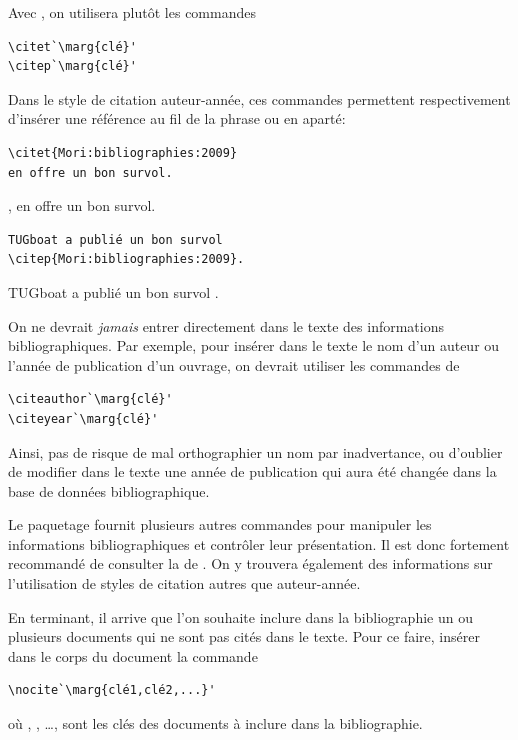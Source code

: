 Avec , on utilisera plutôt les commandes
\begin{lstlisting}
\citet`\marg{clé}'
\citep`\marg{clé}'
\end{lstlisting}
Dans le style de citation auteur-année, ces commandes permettent
respectivement d'insérer une référence au fil de la phrase ou en
aparté:
\begin{demo}
  \begin{texample}[0.55\linewidth]
\begin{lstlisting}
\citet{Mori:bibliographies:2009}
en offre un bon survol.
\end{lstlisting}
    \producing
    \citet{Mori:bibliographies:2009},
    en offre un bon survol.
  \end{texample}
  \begin{texample}[0.55\linewidth]
\begin{lstlisting}
TUGboat a publié un bon survol
\citep{Mori:bibliographies:2009}.
\end{lstlisting}
    \producing
    TUGboat a publié un bon survol
    \citep{Mori:bibliographies:2009}.
  \end{texample}
\end{demo}

On ne devrait \emph{jamais} entrer directement dans le texte des
informations bibliographiques. Par exemple, pour insérer dans le texte
le nom d'un auteur ou l'année de publication d'un ouvrage, on devrait
utiliser les commandes de 
\begin{lstlisting}
\citeauthor`\marg{clé}'
\citeyear`\marg{clé}'
\end{lstlisting}
Ainsi, pas de risque de mal orthographier un nom par inadvertance, ou
d'oublier de modifier dans le texte une année de publication qui aura
été changée dans la base de données bibliographique.

Le paquetage fournit plusieurs autres commandes pour manipuler les
informations bibliographiques et contrôler leur présentation. Il est
donc fortement recommandé de consulter la %
de . On y trouvera également des informations sur
l'utilisation de styles de citation autres que auteur-année.

En terminant, il arrive que l'on souhaite inclure dans la
bibliographie un ou plusieurs documents qui ne sont pas cités dans le
texte. Pour ce faire, insérer dans le corps du document la commande
\begin{lstlisting}
\nocite`\marg{clé1,clé2,...}'
\end{lstlisting}
où , , \dots, sont les clés des documents à
inclure dans la bibliographie.

